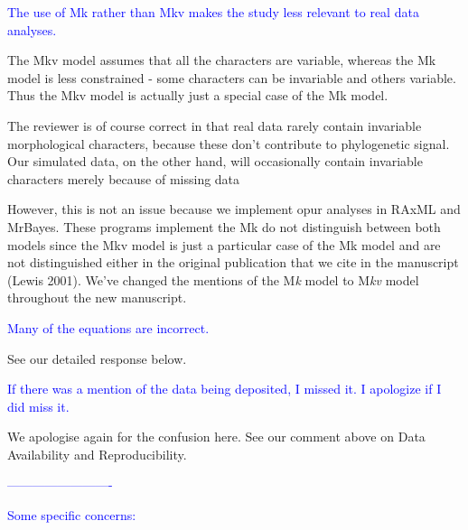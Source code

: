 \documentclass[11pt]{letter}
\begin{document}
\begin{letter}{}
\textcolor{blue}{The use of Mk rather than Mkv makes the study less relevant to real data analyses.}

The Mkv model assumes that all the characters are variable, whereas the Mk model is less constrained - some characters can be invariable and others variable. Thus the Mkv model is actually just a special case of the Mk model.

The reviewer is of course correct in that real data rarely contain invariable morphological characters, because these don't contribute to phylogenetic signal. Our simulated data, on the other hand, will occasionally contain invariable characters merely because of missing data %

However, this is not an issue because we implement opur analyses in RAxML and MrBayes. These programs implement the Mk do not distinguish between both models since the Mkv model is just a particular case of the Mk model and are not distinguished either in the original publication that we cite in the manuscript (Lewis 2001). We've changed the mentions of the M\textit{k} model to M\textit{kv} model throughout the new manuscript.





\textcolor{blue}{Many of the equations are incorrect.}

See our detailed response below.


\textcolor{blue}{If there was a mention of the data being deposited, I missed it. I apologize if I did miss it.}

We apologise again for the confusion here. See our comment above on Data Availability and Reproducibility.


\textcolor{blue}{-------------------------}

\textcolor{blue}{Some specific concerns:}


\end{letter}
\end{document}
